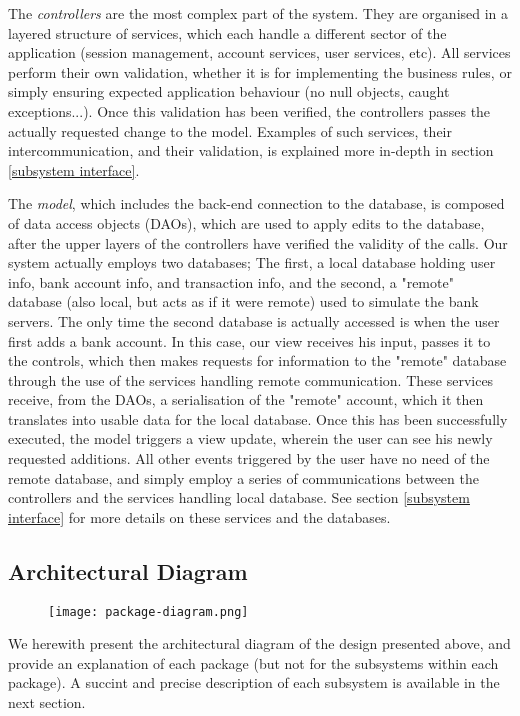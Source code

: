 \documentclass[12pt]{article}
\begin{document}
The \textit{controllers} are the most complex part of the system. They are organised in a layered structure of services, which each handle a different sector of the application (session management, account services, user services, etc). All services perform their own validation, whether it is for implementing the business rules, or simply ensuring expected application behaviour (no null objects, caught exceptions...). Once this validation has been verified, the controllers passes the actually requested change to the model. Examples of such services, their intercommunication, and their validation, is explained more in-depth in section \ref{subsystem interface}.

The \textit{model}, which includes the back-end connection to the database, is composed of data access objects (DAOs), which are used to apply edits to the database, after the upper layers of the controllers have verified the validity of the calls. Our system actually employs two databases; The first, a local database holding user info, bank account info, and transaction info, and the second, a "remote" database (also local, but acts as if it were remote) used to simulate the bank servers. The only time the second database is actually accessed is when the user first adds a bank account. In this case, our view receives his input, passes it to the controls, which then makes requests for information to the "remote" database through the use of the services handling remote communication. These services receive, from the DAOs, a serialisation of the "remote" account, which it then translates into usable data for the local database. Once this has been successfully executed, the model triggers a view update, wherein the user can see his newly requested additions. All other events triggered by the user have no need of the remote database, and simply employ a series of communications between the controllers and the services handling local database. See section \ref{subsystem interface} for more details on these services and the databases.

\subsection{Architectural Diagram}

\begin{figure}[H]
\texttt{[image: package-diagram.png]}
\end{figure}

We herewith present the architectural diagram of the design presented above, and provide an explanation of each package (but not for the subsystems within each package). A succint and precise description of each subsystem is available in the next section.
\end{document}
